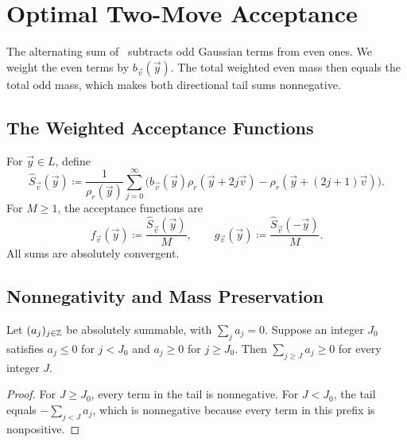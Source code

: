 \section{Optimal Two-Move Acceptance}
\label{sec:construction}

The alternating sum of~\cite{GartnerFull} subtracts odd Gaussian terms from even ones. We weight the even terms by $b_{\vec v}(\vec y)$. The total weighted even mass then equals the total odd mass, which makes both directional tail sums nonnegative.

\subsection{The Weighted Acceptance Functions}

\begin{definition}
\label{def:sum}
For $\vec y\in L$, define
\begin{equation}
\label{eq:sum}
 \widehat S_{\vec v}(\vec y)\coloneqq
 \frac1{\rho_r(\vec y)}\sum_{j=0}^{\infty}
 \bigl(b_{\vec v}(\vec y)\rho_r(\vec y+2j\vec v)-\rho_r(\vec y+(2j+1)\vec v)\bigr).
\end{equation}
For $M\ge1$, the acceptance functions are
\begin{equation}
\label{eq:functions}
 \boxed{\displaystyle
 f_{\vec v}(\vec y)\coloneqq\frac{\widehat S_{\vec v}(\vec y)}M,
 \qquad
 g_{\vec v}(\vec y)\coloneqq\frac{\widehat S_{\vec v}(-\vec y)}M.}
\end{equation}
All sums are absolutely convergent.
\end{definition}

\subsection{Nonnegativity and Mass Preservation}

\begin{lemma}
\label{lem:tails}
Let $(a_j)_{j\in\mathbb{Z}}$ be absolutely summable, with $\sum_j a_j=0$. Suppose an integer $J_0$ satisfies $a_j\le0$ for $j<J_0$ and $a_j\ge0$ for $j\ge J_0$. Then $\sum_{j\ge J}a_j\ge0$ for every integer $J$.
\end{lemma}
\begin{proof}
For $J\ge J_0$, every term in the tail is nonnegative. For $J<J_0$, the tail equals $-\sum_{j<J}a_j$, which is nonnegative because every term in this prefix is nonpositive.
\end{proof}

